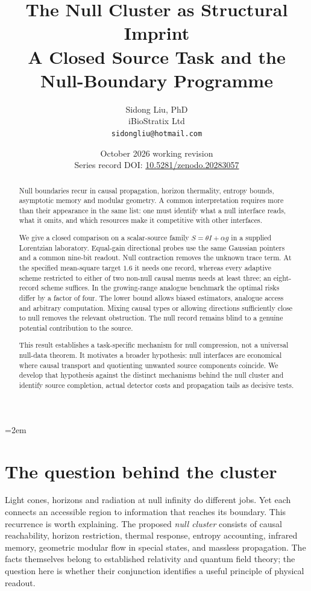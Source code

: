 \documentclass[12pt,a4paper]{article}
\title{\textbf{The Null Cluster as Structural Imprint}\\
\large A Closed Source Task and the Null-Boundary Programme}
\author{Sidong Liu, PhD\\\small iBioStratix Ltd\\\small\texttt{sidongliu@hotmail.com}}
\date{October 2026 working revision\\\small Series record DOI:
\href{https://doi.org/10.5281/zenodo.20283057}{10.5281/zenodo.20283057}}
\theoremstyle{definition}
\begin{document}
\emergencystretch=2em
\raggedbottom
\maketitle

\begin{abstract}
Null boundaries recur in causal propagation, horizon thermality, entropy
bounds, asymptotic memory and modular geometry. A common interpretation
requires more than their appearance in the same list: one must identify
what a null interface reads, what it omits, and which resources make it
competitive with other interfaces.

We give a closed comparison on a scalar-source family
$S=\theta I+\alpha g$ in a supplied Lorentzian laboratory. Equal-gain
directional probes use the same Gaussian pointers and a common nine-bit
readout. Null contraction removes the unknown trace term. At the specified
mean-square target $1.6$ it needs one record, whereas every adaptive scheme
restricted to either of two non-null causal menus needs at least three;
an eight-record scheme suffices. In the growing-range analogue benchmark
the optimal risks differ by a factor of four. The lower bound allows biased
estimators, analogue access and arbitrary computation. Mixing causal types or allowing
directions sufficiently close to null removes the relevant obstruction.
The null record remains blind to a genuine potential contribution to the
source.

This result establishes a task-specific mechanism for null compression,
not a universal null-data theorem. It motivates a broader hypothesis:
null interfaces are economical where causal transport and quotienting
unwanted source components coincide. We develop that hypothesis against
the distinct mechanisms behind the null cluster and identify source
completion, actual detector costs and propagation tails as decisive tests.
\end{abstract}

\section{The question behind the cluster}
\label{sec:question}

Light cones, horizons and radiation at null infinity do different jobs.
Yet each connects an accessible region to information that reaches its
boundary. This recurrence is worth explaining. The proposed \emph{null
cluster} consists of causal reachability, horizon restriction, thermal
response, entropy accounting, infrared memory, geometric modular flow in
special states, and massless propagation. The facts themselves belong to
established relativity and quantum field theory; the question here is
whether their conjunction identifies a useful principle of physical
readout.
\end{document}

